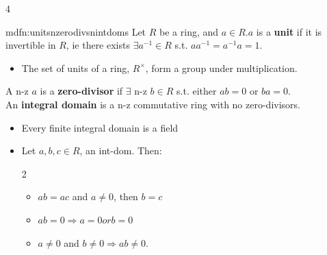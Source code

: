 \documentclass[landscape, 8pt]{extarticle}
\begin{document}
\begin{multicols*}{4}
		
		\begin{mdfn}{mdfn:unitsnzerodivsnintdoms}{ }
			Let $R$ be a ring, and $a \in R$.$a$ is a \textbf{unit} if it is invertible in $R$, ie there exists $\exists a^{-1} \in R$ s.t. $aa^{-1} = a^{-1}a = 1$.
			\begin{itemize}
				\item The set of units of a ring, $R^\times$, form a group under multiplication.
			\end{itemize}
			A n-z $a$ is a \textbf{zero-divisor} if $\exists$ n-z $b \in R$ s.t. either $ab = 0$ or $ba=0$.\\
			An \textbf{integral domain} is a n-z commutative ring with no zero-divisors.
			\begin{itemize}
				\item Every finite integral domain is a field
				\item Let $a, b, c \in R$, an int-dom. Then:
				\vspace*{-5ex}
				\begin{multicols*}{2}
				\begin{itemize}
					\item $ab = ac$ and $a \ne 0$, then $b = c$
					\item $ab = 0 \Rightarrow a = 0 or b=0$
					\item $a \ne 0$ and $b \ne 0 \Rightarrow ab \ne 0$.
				\end{itemize}
				\end{multicols*}
			\end{itemize}
			
		\end{mdfn}
		

\end{multicols*}
\end{document}
